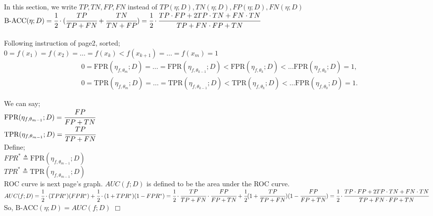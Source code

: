 \documentclass[a4paper,12pt,dvipdfmx]{article}
\newenvironment{proof}{\medskip
  \noindent{\scshape Proof:}}{\quad $\Box$\medskip}
\begin{document}
\noindent
\begin{proof}
\\
In this section, we write $TP, TN, FP, FN$ instead of $TP(\eta;D), TN(\eta;D), FP(\eta;D), FN(\eta;D)$\\

$
\textrm{B-ACC}(\eta;D) \\
  = \cfrac{1}{2} \cdot ( \cfrac{TP}{TP+FN}  + \cfrac{TN}{TN+FP}  )\\
  =\cfrac{1}{2} \cdot \cfrac{TP \cdot FP+2TP \cdot TN + FN \cdot TN}{TP+FN \cdot FP+TN}
$
\\ \\


\noindent
Following instruction of page2, sorted;\\
 $0 = f(x_1) = f(x_2) = \dots = f(x_k) < f(x_{k+1}) = \dots = f(x_m) = 1$\\
 \noindent
\begin{align*}
  &0 = \textrm{FPR}(\eta_{f,\theta_m};D) = \dots = \textrm{FPR}(\eta_{f,\theta_{k-1}};D) < \textrm{FPR}(\eta_{f,\theta_k};D) < \dots \textrm{FPR}(\eta_{f,\theta_0};D)=1,\\
  &0 = \textrm{TPR}(\eta_{f,\theta_m};D) = \dots = \textrm{TPR}(\eta_{f,\theta_{k-1}};D) < \textrm{TPR}(\eta_{f,\theta_k};D) < \dots \textrm{FPR}(\eta_{f,\theta_0};D)=1.
\end{align*}


\noindent
We can say;\\
$\textrm{FPR}(\eta_{f,\theta_{m-1}};D) = \cfrac{FP}{FP+TN}$\\
$\textrm{TPR}(\eta_{f,\theta_{m-1}};D) = \cfrac{TP}{TP+FN}$\\

\noindent
Define;\\
$FPR^* \triangleq \textrm{FPR}(\eta_{f,\theta_{m-1}};D)$\\
$TPR^* \triangleq \textrm{TPR}(\eta_{f,\theta_{m-1}};D)$\\

ROC curve is next page's graph.
$AUC(f;D)$ is defined to be the area under the ROC curve. \\

$
AUC(f;D) \\
=\cfrac{1}{2} \cdot (TPR^*)(FPR^*) + \cfrac{1}{2} \cdot (1+TPR^*)(1-FPR^*) \\
=\cfrac{1}{2} \cdot \cfrac{TP}{TP+FN}\cdot \cfrac{FP}{FP+TN} + \cfrac{1}{2}(1+\cfrac{TP}{TP+FN})(1-\cfrac{FP}{FP+TN}) \\
=\cfrac{1}{2} \cdot \cfrac{TP\cdot FP + 2 TP \cdot TN + FN \cdot TN}{TP+FN \cdot FP+TN}\\
$
\\

So, $\textrm{B-ACC}(\eta;D) = AUC(f;D)$
\end{proof}
\end{document}
